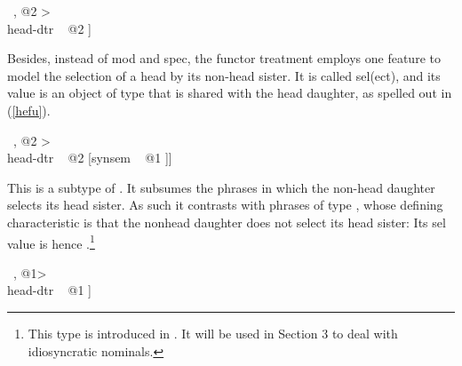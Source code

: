 \documentclass[output=paper]{langsci/langscibook}
\begin{document}
\begin{exe}
\ex\label{mark1} 
\begin{avm}
\end{avm}
\ex\label{mark2} 
\begin{avm}
[\type{head-nonarg-phr}                    \\
 synsem|loc|cat|mark ~ @1 \type{marking}   \\
 dtrs ~ <[synsem|loc|cat|mark ~ @1] ~, @2 > \\
 head-dtr ~ @2 ]
\end{avm}
\end{exe}

\noindent
Besides, instead of {\sc mod} and {\sc spec}, the functor treatment employs 
one feature to model the selection of a head by its non-head sister. It is   
called {\sc sel(ect)}, and its value is an object of type  that is 
shared with the head daughter, as spelled out in (\ref{hefu}).  

\begin{exe}
\ex\label{hefu} 
\begin{avm}
[\type{head-functor-phr}                     \\
 dtrs ~ <[synsem|loc|cat|head|sel ~ @1]~, @2 > \\
 head-dtr ~ @2 [synsem ~ @1 ]]
\end{avm}
\end{exe} 

\noindent
This is a subtype of . It subsumes 
the phrases in which the non-head daughter selects its head sister.
As such it contrasts with phrases of type  
, whose defining characteristic is 
that the nonhead daughter does not select its head sister: Its {\sc sel} value 
is hence .\footnote{This type is introduced in 
\citet[130]{VanEynde98a}. It will be used in Section 3 to deal with 
idiosyncratic nominals.}   

\begin{exe}
\ex\label{hein} 
\begin{avm}
[\type{head-independent-phr}                           \\
 dtrs ~ <[synsem|loc|cat|head|sel ~ \type{none}]~, @1> \\
 head-dtr ~ @1 ]
\end{avm}
\end{exe}    
\end{document}
